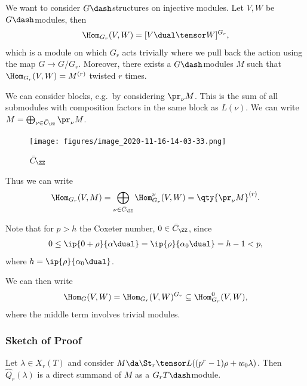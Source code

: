 We want to consider \(G\dash\)structures on injective modules. Let
\(V, W\) be \(G\dash\)modules, then
\begin{align*}  
\Hom_{G_r}(V, W) = [V\dual \tensor W]^{G_r}
,\end{align*} which is a module on which \(G_r\) acts trivially where we
pull back the action using the map \(G \to G/G_r\). Moreover, there
exists a \(G\dash\)modules \(M\) such that
\(\Hom_{G_r}(V, W) = M^{(r)}\) twisted \(r\) times.

We can consider blocks, e.g.~by considering \(\pr_\nu M\). This is the
sum of all submodules with composition factors in the same block as
\(L(\nu)\). We can write
\(M = \bigoplus_{\nu\in \bar{C}_\ZZ} \pr_\nu M\).

\begin{figure}
\centering
\texttt{[image: figures/image\_2020-11-16-14-03-33.png]}
\caption{\(\bar{C}_\ZZ\)}
\end{figure}

Thus we can write
\begin{align*}  
\Hom_{G_r}(V, M) = \bigoplus_{\nu\in \bar{C}_\ZZ} \Hom_{G_r}^\nu(V, W) = \qty{ \pr_\nu M }^{(r)}
.\end{align*}

Note that for \(p>h\) the Coxeter number, \(0\in \bar{C}_\ZZ\), since
\begin{align*}  
0 \leq \ip{0+\rho}{\alpha\dual} = \ip{\rho}{\alpha_0\dual} = h-1 < p
,\end{align*} where \(h = \ip{\rho}{\alpha_0\dual}\).

We can then write
\begin{align*}  
\Hom_G(V, W) = \Hom_{G_r}(V, W)^{G_r} \subseteq \Hom_{G_r}^0(V, W)
,\end{align*} where the middle term involves trivial modules.

\hypertarget{sketch-of-proof}{%
\subsubsection{Sketch of Proof}\label{sketch-of-proof}}

\begin{claim}

Let \(\lambda \in X_r(T)\) and consider
\(M \da \St_r \tensor L( (p^r-1)\rho + w_0 \lambda )\). Then
\(\hat{Q}_r(\lambda)\) is a direct summand of \(M\) as a
\(G_r T\dash\)module.

\end{claim}

